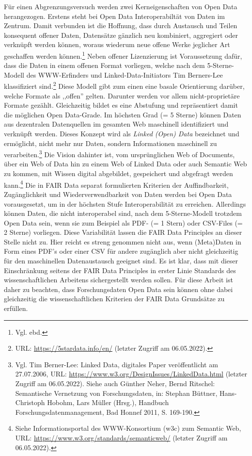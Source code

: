Für einen Abgrenzungsversuch werden zwei Kerneigenschaften von Open Data herangezogen. Erstens steht bei Open Data Interoperabiltät von Daten im Zentrum. Damit verbunden ist die Hoffnung, dass durch Austausch und Teilen konsequent offener Daten, Datensätze gänzlich neu kombiniert, aggregiert oder verknüpft werden können, woraus wiederum neue offene Werke jeglicher Art geschaffen werden können.\footnote{Vgl. ebd.} Neben offener Lizenzierung ist Voraussetzung dafür, dass die Daten in einem offenen Format vorliegen, welche nach dem 5-Sterne-Modell des WWW-Erfinders und Linked-Data-Initiators Tim Berners-Lee klassifiziert sind.\footnote{URL: \url{https://5stardata.info/en/} (letzter Zugriff am 06.05.2022).} Diese Modell gibt zum einen eine basale Orientierung darüber, welche Formate als ,,offen'' gelten. Darunter werden vor allem nicht-proprietäre Formate gezählt. Gleichzeitig bildet es eine Abstufung und repräsentiert damit die möglichen Open Data-Grade. Im höchsten Grad (= 5 Sterne) können Daten aus dezentralen Datenquellen im gesamten Web maschinell identifiziert und verknüpft werden. Dieses Konzept wird als \textit{Linked (Open) Data} bezeichnet und ermöglicht, nicht mehr nur Daten, sondern Informationen maschinell zu verarbeiten.\footnote{Vgl. Tim Berner-Lee: Linked Data, digitales Paper veröffentlicht am 27.07.2006, URL: \url{https://www.w3.org/DesignIssues/LinkedData.html} (letzter Zugriff am 06.05.2022). Siehe auch Günther Neher, Bernd Ritschel: Semantische Vernetzung von Forschungsdaten, in: Stephan Büttner, Hans-Christoph Hobohm, Lars Müller (Hrsg.), Handbuch Forschungsdatenmanagement, Bad Honnef 2011, S. 169-190.} Die Vision dahinter ist, vom ursprünglichen Web of Documents, über ein Web of Data hin zu einem Web of Linked Data oder auch Semantic Web zu kommen, mit Wissen digital abgebildet, gespeichert und abgefragt werden kann.\footnote{Siehe Informationsportal des WWW-Konsortium (w3c) zum Semantic Web, URL: \url{https://www.w3.org/standards/semanticweb/} (letzter Zugriff am 06.05.2022).} Die in FAIR Data separat formulierten Kriterien der Auffindbarkeit, Zugänglichkeit und Wiederverwendbarkeit von Daten werden bei Open Data vorausgesetzt, um in der höchsten Stufe Interoperabilität zu erreichen. Allerdings können Daten, die nicht interoperabel sind, nach dem 5-Sterne-Modell trotzdem Open Data sein, wenn sie zum Beispiel als PDF- (= 1 Stern) oder CSV-Files (= 2 Sterne) vorliegen. Diese Variabilität lassen die FAIR Data Principles an dieser Stelle nicht zu. Hier reicht es streng genommen nicht aus, wenn (Meta)Daten in Form eines PDF's oder einer CSV für andere zugänglich aber nicht gleichzeitig für den maschinellen Datenaustausch geeignet sind. Es ist klar, dass mit dieser Einschränkung seitens der FAIR Data Principles in erster Linie Standards des wissenschaftlichen Arbeitens sichergestellt werden sollen. Für diese Arbeit ist daher zu beachten, dass Forschungsdaten Open Data sein können ohne dabei gleichzeitig die wissenschaftlichen Kriterien der FAIR Data Grundsätze zu erfüllen.

